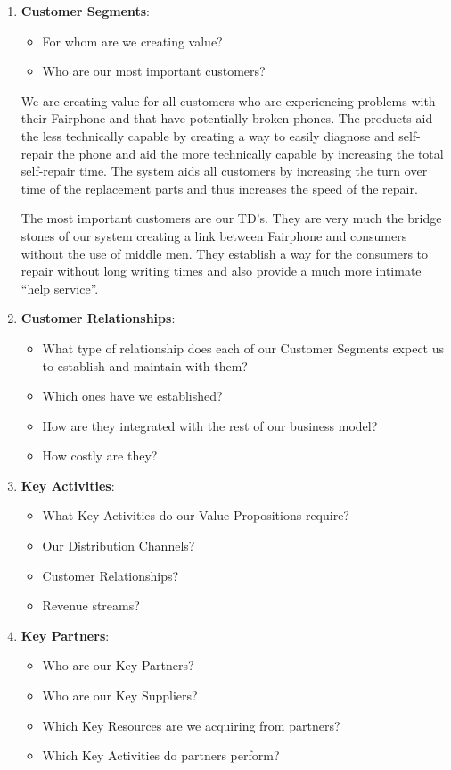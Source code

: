 \documentclass[final,a4paper]{report} %
\begin{document}
\begin{enumerate}
		\item \textbf{Customer Segments}:
		\begin{itemize}
			\item For whom are we creating value?
			\item Who are our most important customers?
		\end{itemize}
		
	We are creating value for all customers who are experiencing problems with their Fairphone and that have potentially broken phones. The products aid the less technically capable by creating a way to easily diagnose and self-repair the phone and aid the more technically capable by increasing the total self-repair time. The system aids all customers by increasing the turn over time of the replacement parts and thus increases the speed of the repair.
	 
	The most important customers are our TD's. They are very much the bridge stones of our system creating a link between Fairphone and consumers without the use of middle men. They establish a way for the consumers to repair without long writing times and also provide a much more intimate ``help service''.
		
		\item \textbf{Customer Relationships}:
		\begin{itemize}
			\item What type of relationship does each of our Customer Segments expect us to establish and maintain with them?
			\item Which ones have we established?
			\item How are they integrated with the rest of our business model?
			\item How costly are they?
		\end{itemize}
		
		\item \textbf{Key Activities}:
		\begin{itemize}
			\item What Key Activities do our Value Propositions require?
			\item Our Distribution Channels?
			\item Customer Relationships?
			\item Revenue streams?
		\end{itemize}
		
		\item \textbf{Key Partners}:
		\begin{itemize}
			\item Who are our Key Partners?
			\item Who are our Key Suppliers?
			\item Which Key Resources are we acquiring from partners?
			\item Which Key Activities do partners perform?
		\end{itemize}
		

\end{enumerate}
\end{document}
